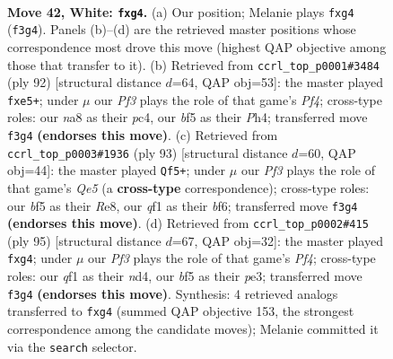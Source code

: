 \documentclass[11pt]{article}
\begin{document}
\clearpage

\begin{figure}[p]\centering
\begin{subfigure}{0.46\textwidth}\centering
\resizebox{\linewidth}{!}{%
\newchessgame
\chessboard[
  setfen={n6r/1Q6/7k/1p3b2/6pp/P2P1P2/7K/4Nq2 w - - 14 42},
  showmover=false,
  pgfstyle=straightmove, color=movearrow, markmove={f3-g4}
]}
\caption{}
\end{subfigure}\hfill
\begin{subfigure}{0.46\textwidth}\centering
\resizebox{\linewidth}{!}{%
\newchessgame
\chessboard[
  setfen={8/4b2p/5k2/4p3/2p2P1P/5q2/3Q1PNK/8 w - - 0 47},
  showmover=false,
  pgfstyle=straightmove, color=movearrow, markmove={f4-e5}
]}
\caption{}
\end{subfigure}
\\[4pt]
\begin{subfigure}{0.46\textwidth}\centering
\resizebox{\linewidth}{!}{%
\newchessgame
\chessboard[
  setfen={4r1k1/5pn1/5BpQ/p3P3/P3q3/1N6/5K2/8 b - - 11 47},
  showmover=false,
  pgfstyle=straightmove, color=movearrow, markmove={e4-f5}
]}
\caption{}
\end{subfigure}\hfill
\begin{subfigure}{0.46\textwidth}\centering
\resizebox{\linewidth}{!}{%
\newchessgame
\chessboard[
  setfen={8/1p6/3n4/5p2/3N2Pk/r1n1P2P/6B1/2R3K1 b - - 2 48},
  showmover=false,
  pgfstyle=straightmove, color=movearrow, markmove={f5-g4}
]}
\caption{}
\end{subfigure}
\caption{\textbf{Move 42, White: \texttt{fxg4}.} (a) Our position; Melanie plays \texttt{fxg4} (\texttt{f3g4}). Panels (b)--(d) are the retrieved master positions whose correspondence most drove this move (highest QAP objective among those that transfer to it). (b) Retrieved from \texttt{ccrl\_top\_p0001\#3484} (ply 92) [structural distance $d$=64, QAP obj=53]: the master played \texttt{fxe5+}; under $\mu$ our \emph{Pf3} plays the role of that game's \emph{Pf4}; cross-type roles: our \emph{n}a8 as their \emph{p}c4, our \emph{b}f5 as their \emph{P}h4; transferred move \texttt{f3g4} \textbf{(endorses this move)}. (c) Retrieved from \texttt{ccrl\_top\_p0003\#1936} (ply 93) [structural distance $d$=60, QAP obj=44]: the master played \texttt{Qf5+}; under $\mu$ our \emph{Pf3} plays the role of that game's \emph{Qe5} (a \textbf{cross-type} correspondence); cross-type roles: our \emph{b}f5 as their \emph{R}e8, our \emph{q}f1 as their \emph{b}f6; transferred move \texttt{f3g4} \textbf{(endorses this move)}. (d) Retrieved from \texttt{ccrl\_top\_p0002\#415} (ply 95) [structural distance $d$=67, QAP obj=32]: the master played \texttt{fxg4}; under $\mu$ our \emph{Pf3} plays the role of that game's \emph{Pf4}; cross-type roles: our \emph{q}f1 as their \emph{n}d4, our \emph{b}f5 as their \emph{p}e3; transferred move \texttt{f3g4} \textbf{(endorses this move)}. Synthesis: 4 retrieved analogs transferred to \texttt{fxg4} (summed QAP objective 153, the strongest correspondence among the candidate moves); Melanie committed it via the \texttt{search} selector.}
\label{fig:thought-m82}
\end{figure}
\end{document}
